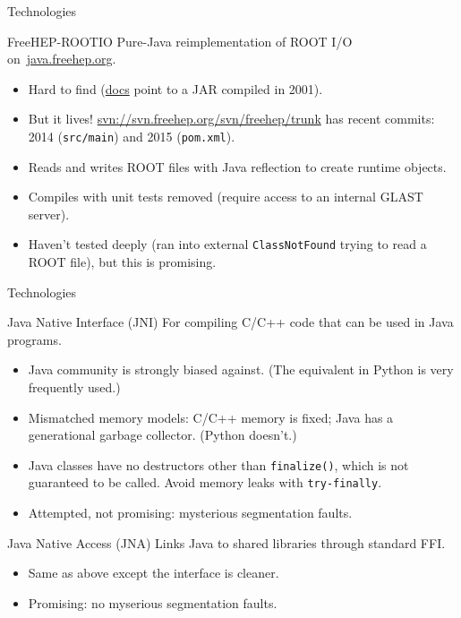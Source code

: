 \documentclass{beamer}
\begin{document}
\begin{frame}{Technologies}

\begin{block}{FreeHEP-ROOTIO}
Pure-Java reimplementation of ROOT I/O \mbox{on \url{java.freehep.org}.\hspace{-1 cm}}
\begin{itemize}
\item Hard to find (\href{http://java.freehep.org/freehep-rootio/}{docs} point to a JAR compiled in 2001).
\item But it lives! \url{svn://svn.freehep.org/svn/freehep/trunk} has recent commits: 2014 ({\tt src/main}) and 2015 ({\tt pom.xml}).
\item Reads and writes ROOT files with Java reflection to create runtime objects.
\item Compiles with unit tests removed (require access to an internal GLAST server).
\item Haven't tested deeply (ran into external {\tt ClassNotFound} trying to read a ROOT file), but this is promising.
\end{itemize}
\end{block}
\end{frame}

\begin{frame}{Technologies}
\begin{block}{Java Native Interface (JNI)}
For compiling C/C++ code that can be used in Java programs.
\begin{itemize}
\item Java community is strongly biased against. (The equivalent in Python is very frequently used.)
\item Mismatched memory models: C/C++ memory is fixed; Java has a generational garbage collector. (Python doesn't.)
\item Java classes have no destructors other than {\tt finalize()}, which is not guaranteed to be called. Avoid memory leaks with {\tt try-finally}.
\item Attempted, not promising: mysterious segmentation faults.
\end{itemize}
\end{block}

\begin{block}{Java Native Access (JNA)}
Links Java to shared libraries through standard FFI.
\begin{itemize}
\item Same as above except the interface is cleaner.
\item Promising: no myserious segmentation faults.
\end{itemize}
\end{block}
\end{frame}
\end{document}

